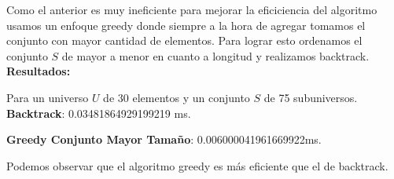 \documentclass{article}
\begin{document}
Como el anterior es muy ineficiente para mejorar la eficiciencia del algoritmo usamos un enfoque greedy donde siempre a la hora de agregar tomamos el conjunto con mayor cantidad de elementos. Para lograr esto ordenamos el conjunto \(S\) de mayor a menor en cuanto a longitud y realizamos backtrack.\\

\textbf{Resultados:}

Para un universo \(U\) de 30 elementos y un conjunto \(S\) de 75 subuniversos. \\

\textbf{Backtrack}: 0.03481864929199219 ms.

\textbf{Greedy Conjunto Mayor Tamaño}: 0.006000041961669922ms.

Podemos observar que el algoritmo greedy es más eficiente que el de backtrack.
\end{document}
